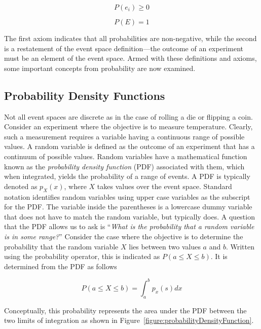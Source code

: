 \begin{equation}
\label{equ:probabbilityGreaterEqualZero}
P(e_i)  \geq 0
\end{equation}

\begin{equation}
\label{equ:totalProbabilityEqualOne}
P(E)  = 1
\end{equation}

The first axiom indicates that all probabilities are non-negative, while
the second is a restatement of the event space definition---the outcome
of an experiment must be an element of the event space. Armed with these
definitions and axioms, some important concepts from probability are now
examined.

\subsection{Probability Density Functions}
\label{subsection:probability-density-functions}

Not all event spaces are discrete as in the case of rolling a die or
flipping a coin. Consider an experiment where the objective is to
measure temperature. Clearly, such a measurement requires a variable
having a continuous range of possible values. A random variable is
defined as the outcome of an experiment that has a continuum of possible
values. Random variables have a mathematical function known as the
\emph{probability density function} (PDF) associated with them, which
when integrated, yields the probability of a range of events. A PDF is
typically denoted as $p_X(x)$, where
$X$ takes values over the event space. Standard notation identifies
random variables using upper case variables as the subscript for the
PDF. The variable inside the parentheses is a lowercase dummy variable
that does not have to match the random variable, but typically does. A
question that the PDF allows us to ask is ``\emph{What is the
probability that a random variable is in some range?}'' Consider the
case where the objective is to determine the probability that the random
variable $X$ lies between two values $a$ and $b$. Written
using the probability operator, this is indicated as
$P(a \leq X \leq b)$. It is determined from the PDF as
follows

\begin{equation}
\label{probabilityDensityFunction}
P(a \leq X \leq b) = \int^b_a p_x(s)dx
\end{equation}

Conceptually, this probability represents the area under the PDF between
the two limits of integration as shown in 
Figure~\ref{figure:probabilityDensityFunction}.

